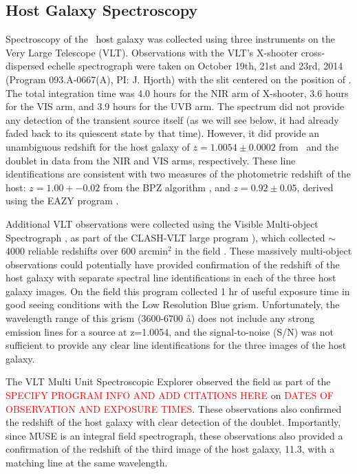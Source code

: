 \subsection{Host Galaxy Spectroscopy}\label{sec:Spectroscopy}

Spectroscopy of the \spock\ host galaxy was collected using three
instruments on the Very Large Telescope (VLT).  Observations with the
VLT's X-shooter cross-dispersed echelle spectrograph
\citep{Vernet:2011} were taken on October 19th, 21st and 23rd, 2014
(Program 093.A-0667(A), PI: J. Hjorth) with the slit centered on the
position of .  The total integration time was 4.0 hours for the
NIR arm of X-shooter, 3.6 hours for the VIS arm, and 3.9 hours for the
UVB arm.  The spectrum did not provide any detection of the transient
source itself (as we will see below, it had already faded back to its
quiescent state by that time).  However, it did provide an unambiguous
redshift for the host galaxy of $z=1.0054\pm0.0002$ from \Ha\ and the
 doublet in data from the NIR and VIS arms,
respectively.  These line identifications are consistent with two
measures of the photometric redshift of the host: $z=1.00+-0.02$ from
the BPZ algorithm \citep{Benitez:2000}, and $z=0.92\pm0.05$, derived
using the EAZY program \citep{Brammer:2008}.

Additional VLT observations were collected using the Visible
Multi-object Spectrograph \citep[VIMOS][]{LeFevre:2003}, as part of
the CLASH-VLT large program \citep[Program 186.A-0.798; P.I.:
  P. Rosati;][]{Rosati:2014}), which collected $\sim$4000 reliable
redshifts over 600 arcmin$^2$ in the  field
\citep{Grillo:2015a,Balestra:2015}.  These massively multi-object
observations could potentially have provided confirmation of the
redshift of the \spock host galaxy with separate spectral line
identifications in each of the three host galaxy images.  On the
 field this program collected 1 hr of useful exposure time in
good seeing conditions with the Low Resolution Blue grism.
Unfortunately, the wavelength range of this grism (3600-6700 \aa) does
not include any strong emission lines for a source at z=1.0054, and
the signal-to-noise (S/N) was not sufficient to provide any clear line
identifications for the three images of the \spock host galaxy.

The VLT Multi Unit Spectroscopic Explorer
\citep[MUSE;][]{Henault:2003,Bacon:2012} observed the  field
as part of the \textcolor{red}{SPECIFY PROGRAM INFO AND ADD CITATIONS
  HERE} on \textcolor{red}{DATES OF OBSERVATION AND EXPOSURE TIMES}.
These observations also confirmed the redshift of the host galaxy with
clear detection of the  doublet.  Importantly, since
MUSE is an integral field spectrograph, these observations also
provided a confirmation of the redshift of the third image of the host
galaxy, 11.3, with a matching  line at the same
wavelength.


